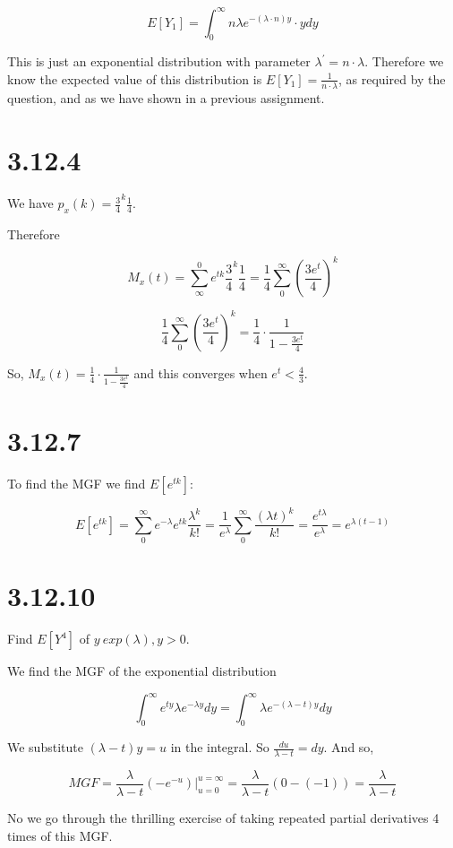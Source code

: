 \documentclass[svgnames]{article}
\begin{document}
$$ E[Y_1]  = \int_{0}^{\infty} n \lambda e^{-(\lambda \cdot n) y}\cdot y dy$$

This is just an exponential distribution with parameter $\lambda^{'} = n \cdot \lambda$. Therefore we know the expected value of this distribution is $E[Y_1]  = \frac{1}{n \cdot \lambda}$, as required by the question, and as we have shown in a previous assignment.  

\section{3.12.4}

We have $p_x(k)=\frac{3}{4}^{k}\frac{1}{4}$. 

Therefore

$$ M_{x}(t)=\sum_{\infty}^{0}e^{tk}\frac{3}{4}^{k}\frac{1}{4}=\frac{1}{4}\sum_{0}^{\infty}(\frac{3e^t}{4})^k$$

$$\frac{1}{4}\sum_{0}^{\infty}(\frac{3e^t}{4})^k=\frac{1}{4} \cdot \frac{1}{1-\frac{3e^t}{4}}$$

So, $ M_{x}(t) = \frac{1}{4} \cdot \frac{1}{1-\frac{3e^t}{4}}$ and this converges when $e^t < \frac{4}{3}$.

\section{3.12.7}

To find the MGF we find $E[e^{tk}]$:

$$ E[e^{tk}] = \sum_{0}^{\infty} e^{-\lambda} e^{tk}\frac{\lambda^{k}}{k!}=\frac{1}{e^{\lambda}}\sum_{0}^{\infty} \frac{(\lambda t)^k}{k!} = \frac{e^{t \lambda}}{e^\lambda}=e^{\lambda(t-1)}$$

\section{3.12.10}

Find $E[Y^4]$ of $y~ exp(\lambda), y > 0$.

We find the MGF of the exponential distribution

$$ \int_{0}^{\infty} e^{ty}\lambda e^{-\lambda y} dy =  \int_{0}^{\infty} \lambda e^{-(\lambda-t) y}dy$$

We substitute $(\lambda - t)y=u$ in the integral. So $\frac{du}{\lambda - t}= dy$. And so,

$$MGF = \frac{\lambda}{\lambda-t}(-e^{-u})\big|^{u=\infty}_{u=0}=  \frac{\lambda}{\lambda-t}(0-(-1))= \frac{\lambda}{\lambda-t}$$

No we go through the thrilling exercise of taking repeated partial derivatives 4 times of this MGF.
\end{document}
